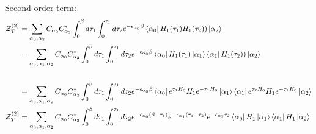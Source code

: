 \documentclass[12pt, two sided]{article}
\begin{document}

Second-order term:
\begin{equation}
\begin{aligned}
\mathcal{Z}_T^{(2)} &=  \sum_{\alpha_0, \alpha_2} C_{\alpha_0} C_{\alpha_2}^{*} \int_0^{\beta} d\tau_1 \int_{0}^{\tau_1} d\tau_2 e^{-\epsilon_{\alpha_0} \beta} \bra{\alpha_0}  H_1(\tau_1) H_1(\tau_2) ) \ket{\alpha_2} \\
&= \sum_{\alpha_0, \alpha_1, \alpha_2} C_{\alpha_0} C_{\alpha_2}^{*} \int_0^{\beta} d\tau_1 \int_{0}^{\tau_1} d\tau_2 e^{-\epsilon_{\alpha_0} \beta} \bra{\alpha_0}  H_1(\tau_1) \ket{\alpha_1} \bra{\alpha_1}   H_1(\tau_2) )  \ket{\alpha_2} \\
\\
&= \sum_{\alpha_0, \alpha_1, \alpha_2} C_{\alpha_0} C_{\alpha_2}^{*} \int_0^{\beta} d\tau_1 \int_{0}^{\tau_1} d\tau_2 e^{-\epsilon_{\alpha_0} \beta} \bra{\alpha_0}  e^{\tau_1 H_0}H_1e^{-\tau_1 H_0}  \ket{\alpha_1} \bra{\alpha_1} e^{\tau_2 H_0}H_1e^{-\tau_2 H_0}  \ket{\alpha_2} \\
\mathcal{Z}_T^{(2)} &= \sum_{\alpha_0, \alpha_1, \alpha_2} C_{\alpha_0} C_{\alpha_2}^{*} \int_0^{\beta} d\tau_1 \int_{0}^{\tau_1} d\tau_2 e^{-\epsilon_{\alpha_0}(\beta-\tau_1)} e^{-\epsilon_{\alpha_1}(\tau_1-\tau_2)} e^{-\epsilon_{\alpha_2} \tau_2} \bra{\alpha_0} H_1 \ket{\alpha_1} \bra{\alpha_1} H_1 \ket{\alpha_2}
\end{aligned}
\end{equation}
\end{document}
